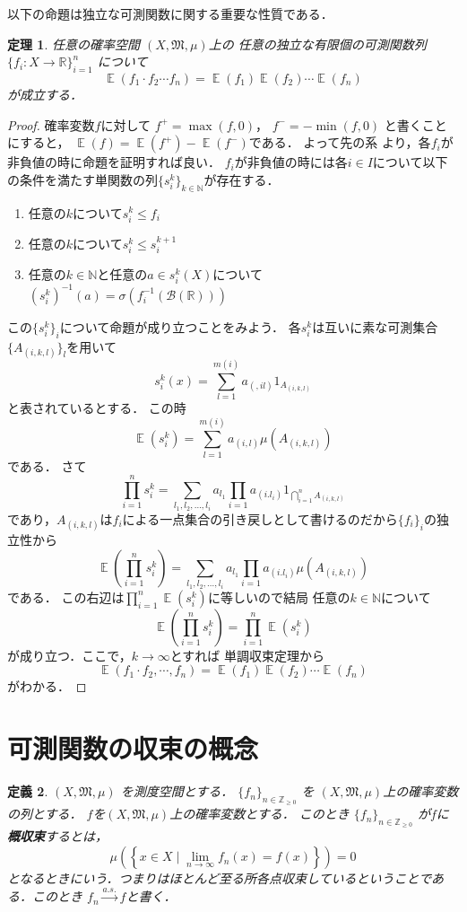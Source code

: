 \documentclass[leqno, a4paper, 12pt]{jsarticle}
\newtheorem{thm}{定理}
\newtheorem{df}[thm]{定義}
\newcommand{\nn}{\mathbb{N}}
\newcommand{\zz}{\mathbb{Z}}
\newcommand{\rr}{\mathbb{R}}
\DeclareMathOperator{\mean}{\mathbb{E}}
\begin{document}
以下の命題は独立な可測関数に関する重要な性質である．
\begin{thm}\label{thm:ind}
任意の確率空間
$(X, \mathfrak{M}, \mu)$上の
任意の独立な有限個の可測関数列
$\{f_i:X\to \rr\}_{i=1}^n$
について
\[
\mean(f_1\cdot f_2  \cdots f_n)=\mean(f_1)\mean(f_2) \cdots \mean(f_n)
\]
が成立する．
\end{thm}
\begin{proof}
確率変数$f$に対して
$f^+=\max(f, 0)$，
$f^-=-\min(f, 0)$
と書くことにすると，
$\mean(f)=\mean(f^+)-\mean(f^-)$である．
よって先の系
より，各$f_i$が非負値の時に命題を証明すれば良い．
$f_i$が非負値の時には各$i\in I$について以下の条件を満たす単関数の列$\{s_i^k\}_{k\in \nn}$が存在する．
\begin{enumerate}
\item 任意の$k$について$s_i^k\le f_i$
\item 任意の$k$について$s_i^k\le s_i^{k+1}$
\item 任意の$k\in \nn$と任意の$a\in s_i^k(X)$について
$(s_i^k)^{-1}(a)=\sigma(f_i^{-1}(\mathcal{B}(\rr)))$
\end{enumerate}
この$\{s_i^k\}_{i}$について命題が成り立つことをみよう．
各$s_i^k$は互いに素な可測集合$\{A_{(i, k,l)}\}_l$を用いて
\[
s_i^k(x)=\sum_{l=1}^{m(i)}a_{(, il)}1_{A_(i, k, l)}
\]
と表されているとする．
この時
\[
\mean(s_i^k)=\sum_{l=1}^{m(i)}a_{(i, l)}\mu(A_{(i, k, l)})
\]
である．
さて
\[
\prod_{i=1}^ns_i^k=\sum_{l_1, l_2, \dots, l_i}a_{l_1}\prod_{i=1}a_{(i. l_i)}1_{\bigcap_{i=1}^nA_{(i, k, l)}}
\]
であり，$A_{(i, k, l)}$は$f_i$による一点集合の引き戻しとして書けるのだから$\{f_i\}_i$の独立性から
\[
\mean\left(\prod_{i=1}^ns_i^k\right)=\sum_{l_1, l_2, \dots, l_i}a_{l_1}\prod_{i=1}a_{(i. l_i)}\mu(A_{(i, k, l)})
\]
である．
この右辺は$\prod_{i=1}^n\mean(s_i^k)$に等しいので結局
任意の$k\in \nn$について
\[
\mean\left(\prod_{i=1}^ns_i^k\right)=\prod_{i=1}^n\mean(s_i^k)
\]
が成り立つ．ここで，$k\to \infty$とすれば
単調収束定理から
\[
\mean(f_1\cdot f_2, \cdots, f_n)=
\mean(f_1)\mean(f_2) \cdots \mean(f_n)
\]
がわかる．
\end{proof}

\section{可測関数の収束の概念}

\begin{df}
$(X, \mathfrak{M}, \mu)$
を測度空間とする．
$\{f_{n}\}_{n\in \zz_{\ge 0}}$
を
$(X, \mathfrak{M}, \mu)$上の確率変数の列とする．
$f$を$(X, \mathfrak{M}, \mu)$上の確率変数とする．
このとき
$\{f_{n}\}_{n\in \zz_{\ge 0}}$
が$f$に\textbf{概収束}するとは，
\[
\mu\left(\left\{x\in X\mid 
\lim_{n\to \infty}f_{n}(x)=f(x)\right\}\right)=0
\]
となるときにいう．つまりはほとんど至る所各点収束しているということである．このとき
$f_{n}\xrightarrow{a. s.}f$と書く．
\end{df}
\end{document}
